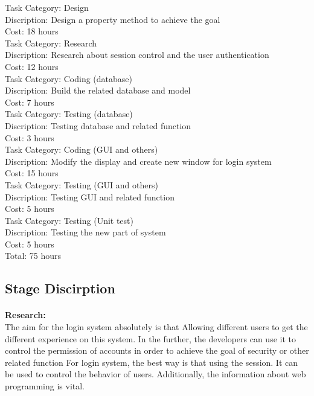 \documentclass[10pt,a4,oneside]{article}
\begin{document}
Task Category: Design\\
Discription: Design a property method to achieve the goal \\
Cost: 18 hours\\

Task Category: Research\\
Discription: Research about session control and the user authentication \\
Cost: 12 hours\\

Task Category: Coding (database)  \\
Discription: Build the related database and model  \\
Cost: 7 hours\\

Task Category: Testing (database)\\
Discription:  Testing database and related function\\
Cost: 3 hours\\

Task Category: Coding (GUI and others)  \\
Discription: Modify the display and create new window for login system  \\
Cost: 15 hours\\

Task Category: Testing (GUI and others)  \\
Discription: Testing GUI and related function\\
Cost: 5 hours\\

Task Category: Testing (Unit test)\\
Discription:  Testing the new part of system\\
Cost: 5 hours\\

Total:  75 hours\\

\subsection*{Stage Discirption}

\paragraph{}
\textbf{Research:}\\
The aim for the login system absolutely is that Allowing different users to get the different experience on this system. In the further, the developers can use it to control the permission of accounts in order to achieve the goal of security or other related function For login system, the best way is that using the session. It can be used to control the behavior of users.  Additionally, the information about web programming is vital.\\
\end{document}

